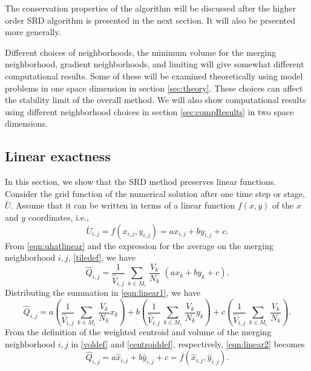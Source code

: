 The conservation properties of the algorithm will be discussed after the
higher order SRD algorithm is presented in the next
section. It will also be prseented more generally.   

Different choices of neighborhoods, the minimum volume for the merging
neighborhood, gradient neighborhoods, and limiting will give
somewhat different computational results. Some of these will be examined
theoretically using model problems in one space dimension in section
\ref{sec:theory}. These choices can affect the stability limit of the
overall method.
We will also show computational results using different neighborhood
choices in section \ref{sec:compResults} in two space dimensions.

\subsection{Linear exactness}
In this section, we show that the SRD method preserves linear functions.
Consider the grid function of the numerical solution after one time step
or stage, $\bar{U}$.  Assume that it can be written in terms of a linear function $f(x,y)$ of the $x$ and $y$ coordinates, i.e.,
\begin{equation}
    \label{eqn:uhatlinear}
\bar{U}_{i,j} = f(x_{i,j},y_{i,j}) = ax_{i,j} + by_{i,j} + c.
\end{equation}
From \eqref{eqn:uhatlinear} and the expression for the average on the merging neighborhood $i,j$, \eqref{tiledef}, we have
\begin{equation}
    \label{eqn:linear1}
\widehat{Q}_{i,j} = \frac{1}{{\widehat V}_{i,j}} \, \sum_{k \in M_i} \,  
\frac{V_k}{N_k}  \,\, (ax_{k} + by_{k} + c).
\end{equation}
Distributing the summation in \eqref{eqn:linear1}, we have
\begin{equation}\label{eqn:linear2}
\widehat{Q}_{i,j} =  a \left(\frac{1}{{\widehat V}_{i,j}} \, \sum_{k \in M_i} \,  
\frac{V_k}{N_k} x_{k} \right) + b\left(\frac{1}{{\widehat V}_{i,j}} \, \sum_{k \in M_i} \,  
\frac{V_k}{N_k} y_{k} \right) + c\left(\frac{1}{{\widehat V}_{i,j}} \, \sum_{k \in M_i} \,
\frac{V_k}{N_k}\right) .
\end{equation}
From the definition of the weighted centroid and volume of the merging neighborhood
$i,j$ in \eqref{voldef} and \eqref{centroiddef}, respectively, \eqref{eqn:linear2} becomes
\begin{equation}\label{eqn:linear3}
\widehat{Q}_{i,j} =  a \widehat{x}_{i,j} + b\widehat{y}_{i,j} + c = f(\widehat{x}_{i,j},\widehat{y}_{i,j}).
\end{equation}
